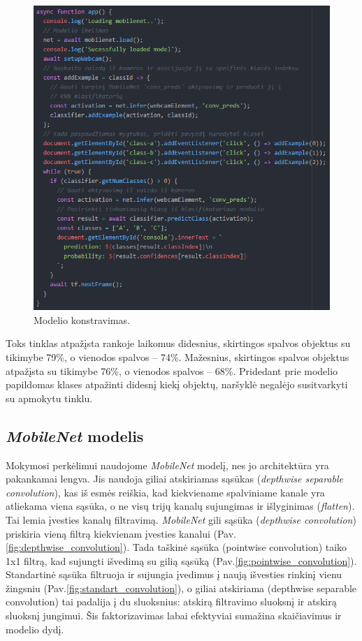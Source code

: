 \documentclass{VUMIFInfKursinis}
\begin{document}
\begin{figure}[h!]
\centering
  \includegraphics[scale=0.9]{img/Prog2.PNG}
  \caption{Modelio konstravimas.}
  \label{fig:Prog2}
\end{figure}

Toks tinklas atpažįsta rankoje laikomus didesnius, skirtingos spalvos objektus su tikimybe 79\%, o vienodos spalvos -- 74\%. Mažesnius, skirtingos spalvos objektus atpažįsta su tikimybe 76\%, o vienodos spalvos -- 68\%. Pridedant prie modelio papildomas klases atpažinti didesnį kiekį objektų, naršyklė negalėjo susitvarkyti su apmokytu tinklu. 

\subsection{\textit{MobileNet} modelis}

Mokymosi perkėlimui naudojome \textit{MobileNet} modelį, nes jo architektūra yra pakankamai lengva. Jis naudoja giliai atskiriamas sąsūkas (\textit{depthwise separable convolution}), kas iš esmės reiškia, kad kiekviename spalviniame kanale yra atliekama viena sąsūka, o ne visų trijų kanalų sujungimas ir išlyginimas (\textit{flatten}). Tai lemia įvesties kanalų filtravimą. \textit{MobileNet} gili sąsūka (\textit{depthwise convolution}) priskiria vieną filtrą kiekvienam įvesties kanalui (Pav.\ref{fig:depthwise_convolution}). Tada taškinė sąsūka (pointwise convolution) taiko 1x1 filtrą, kad sujungti išvedimą su gilią sąsūką (Pav.\ref{fig:pointwise_convolution}). Standartinė sąsūka filtruoja ir sujungia įvedimus į naują išvesties rinkinį vienu žingsniu (Pav.\ref{fig:standart_convolution}), o giliai atskiriama (depthwise separable convolution) tai padalija į du sluoksnius: atskirą filtravimo sluoksnį ir atskirą sluoksnį jungimui. Šis faktorizavimas labai efektyviai sumažina skaičiavimus ir modelio dydį.\cite{10}
\end{document}
